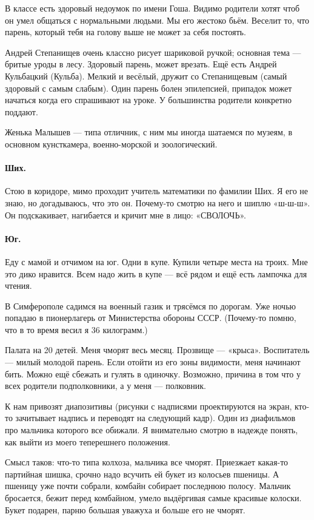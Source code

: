 \documentclass{book}
\begin{document}
В классе есть здоровый недоумок по имени Гоша.
Видимо родители хотят чтоб он умел общаться с нормальными людьми.
Мы его жестоко бьём.
Веселит то, что парень, который тебя на голову выше не может за себя постоять.

Андрей Степанищев очень классно рисует шариковой ручкой;
основная тема --- бритые уроды в лесу.
Здоровый парень, может врезать.
Ещё есть Андрей Кульбацкий (Кульба).
Мелкий и весёлый, дружит со Степанищевым
(самый здоровый с самым слабым).
Один парень болен эпилепсией,
припадок может начаться когда его спрашивают на уроке.
У большинства родители конкретно поддают.

Женька Малышев --- типа отличник,
с ним мы иногда шатаемся по музеям, 
в основном кунсткамера, военно-морской и зоологический.

\paragraph{Ших.}
Стою в коридоре, мимо проходит учитель математики по фамилии Ших.
Я его не знаю, но догадываюсь, что это он.
Почему-то смотрю на него и шиплю «ш-ш-ш».
Он подскакивает, нагибается и кричит мне в лицо: «СВОЛОЧЬ».

\paragraph{Юг.}
Еду с мамой и отчимом на юг.
Одни в купе. 
Купили четыре места на троих.
Мне это дико нравится. 
Всем надо жить в купе ---
всё рядом и ещё есть лампочка для чтения.

В Симферополе садимся на военный газик и трясёмся по дорогам. 
Уже ночью попадаю в пионерлагерь от Министерства обороны СССР.
(Почему-то помню, что в то время весил я 36 килограмм.)

Палата на 20 детей.
Меня чморят весь месяц.
Прозвище --- «крыса».
Воспитатель --- милый молодой парень.
Если отойти из его зоны видимости, меня начинают бить.
Можно ещё сбежать и гулять в одиночку.
Возможно, причина в том что у всех родители подполковники, а у меня --- полковник.

К нам привозят диапозитивы (рисунки с надписями проектируются на экран,
кто-то зачитывает надпись и переводят на следующий кадр).
Один из диафильмов про мальчика которого все обижали.
Я внимательно смотрю в надежде понять, как выйти из моего теперешнего положения.

Смысл таков: что-то типа колхоза, 
мальчика все чморят.
Приезжает какая-то партийная шишка,
срочно надо всучить ей букет из колосьев пшеницы.
А пшеницу уже почти собрали,
комбайн собирает последнюю полосу.
Мальчик бросается, бежит перед комбайном, умело выдёргивая самые красивые колоски.
Букет подарен, парню большая уважуха и больше его не чморят.
\end{document}
